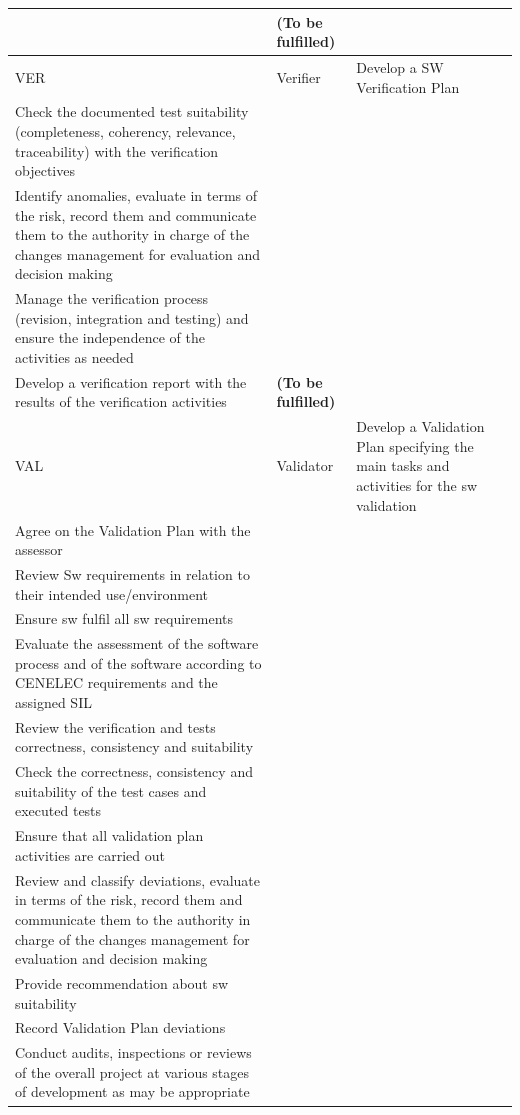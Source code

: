 \documentclass{template/openetcs_article}
\begin{document}
\begin{landscape}
\begin{flushleft}
\begin{supertabular}[H]{|m{1cm}|m{2,5cm}|m{15cm}|m{6cm}|}
&
\textbf{(To be fulfilled)}
\\\hline
VER &
Verifier &
\raggedright
Develop a SW Verification Plan \\
Check the documented test suitability (completeness, coherency, relevance, traceability) with the verification objectives\\
Identify anomalies, evaluate in terms of the risk, record them and communicate them to the authority in charge of the changes management for evaluation and decision making\\
Manage the verification process (revision, integration and testing) and ensure the independence of the activities as needed\\
Develop a verification report with the results of the verification activities &
\textbf{(To be fulfilled)}
\\\hline
VAL &
Validator &
\raggedright
Develop a Validation Plan specifying the main tasks and activities for the sw validation\\
Agree on the Validation Plan with the assessor\\
Review Sw requirements in relation to their intended use/environment\\
Ensure sw fulfil all sw requirements\\
Evaluate the assessment of the software process and of the software according to CENELEC requirements and the assigned SIL\\
Review the verification and tests correctness, consistency and suitability \\
Check the correctness, consistency and suitability of the test cases and executed tests\\
Ensure that all validation plan activities are carried out\\
Review and classify deviations, evaluate in terms of the risk, record them and communicate them to the authority in charge of the changes management for evaluation and decision making\\ 
Provide recommendation about sw suitability\\
Record Validation Plan deviations\\
Conduct audits, inspections or reviews of the overall project at various stages of development as may be appropriate\\

\end{supertabular}
\end{flushleft}
\end{landscape}
\end{document}
